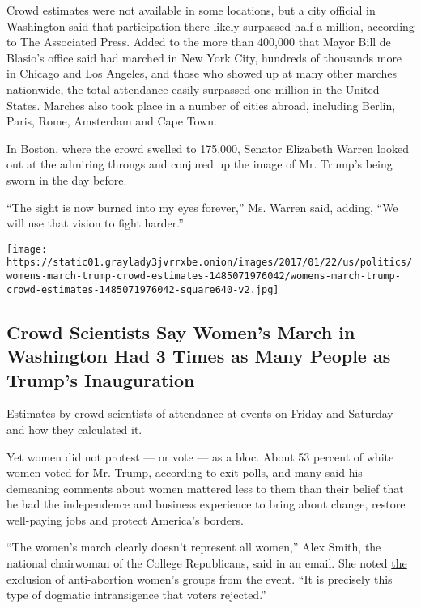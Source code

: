 Crowd estimates were not available in some locations, but a city
official in Washington said that participation there likely surpassed
half a million, according to The Associated Press. Added to the more
than 400,000 that Mayor Bill de Blasio's office said had marched in New
York City, hundreds of thousands more in Chicago and Los Angeles, and
those who showed up at many other marches nationwide, the total
attendance easily surpassed one million in the United States. Marches
also took place in a number of cities abroad, including Berlin, Paris,
Rome, Amsterdam and Cape Town.

In Boston, where the crowd swelled to 175,000, Senator Elizabeth Warren
looked out at the admiring throngs and conjured up the image of Mr.
Trump's being sworn in the day before.

``The sight is now burned into my eyes forever,'' Ms. Warren said,
adding, ``We will use that vision to fight harder.''

\href{https://www.nytimes3xbfgragh.onion/interactive/2017/01/22/us/politics/womens-march-trump-crowd-estimates.html}{}

\texttt{[image: https://static01.graylady3jvrrxbe.onion/images/2017/01/22/us/politics/womens-march-trump-crowd-estimates-1485071976042/womens-march-trump-crowd-estimates-1485071976042-square640-v2.jpg]}

\hypertarget{crowd-scientists-say-womens-march-in-washington-had-3-times-as-many-people-as-trumps-inauguration}{%
\subsection{Crowd Scientists Say Women's March in Washington Had 3 Times
as Many People as Trump's
Inauguration}\label{crowd-scientists-say-womens-march-in-washington-had-3-times-as-many-people-as-trumps-inauguration}}

Estimates by crowd scientists of attendance at events on Friday and
Saturday and how they calculated it.

Yet women did not protest --- or vote --- as a bloc. About 53 percent of
white women voted for Mr. Trump, according to exit polls, and many said
his demeaning comments about women mattered less to them than their
belief that he had the independence and business experience to bring
about change, restore well-paying jobs and protect America's borders.

``The women's march clearly doesn't represent all women,'' Alex Smith,
the national chairwoman of the College Republicans, said in an email.
She noted
\href{https://www.nytimes3xbfgragh.onion/2017/01/18/us/womens-march-abortion.html}{the
exclusion} of anti-abortion women's groups from the event. ``It is
precisely this type of dogmatic intransigence that voters rejected.''

